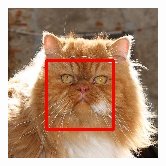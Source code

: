 \documentclass[conference,compsoc]{IEEEtran}
\begin{document}
\begin{figure}
	\begin{multicols}{4}
    		\includegraphics[height=1.35\linewidth]{goodFace2.jpg}\par 

\end{multicols}
\end{figure}
\end{document}
